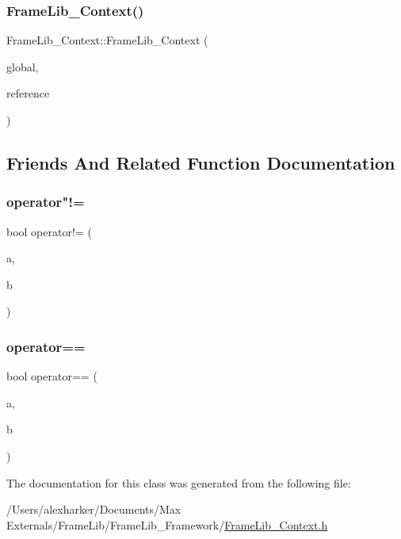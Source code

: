 \subsubsection{\texorpdfstring{Frame\+Lib\+\_\+\+Context()}{FrameLib\_Context()}}
{\footnotesize\ttfamily Frame\+Lib\+\_\+\+Context\+::\+Frame\+Lib\+\_\+\+Context (\begin{DoxyParamCaption}\item[{\hyperlink{class_frame_lib___global}{Frame\+Lib\+\_\+\+Global} $\ast$}]{global,  }\item[{void $\ast$}]{reference }\end{DoxyParamCaption})\hspace{0.3cm}{\ttfamily [inline]}}



\subsection{Friends And Related Function Documentation}
\mbox{\label{class_frame_lib___context_a7aed82ce3d334858032a3c45e3c70169}} 
\subsubsection{\texorpdfstring{operator"!=}{operator!=}}
{\footnotesize\ttfamily bool operator!= (\begin{DoxyParamCaption}\item[{const \hyperlink{class_frame_lib___context}{Frame\+Lib\+\_\+\+Context} \&}]{a,  }\item[{const \hyperlink{class_frame_lib___context}{Frame\+Lib\+\_\+\+Context} \&}]{b }\end{DoxyParamCaption})\hspace{0.3cm}{\ttfamily [friend]}}

\mbox{\label{class_frame_lib___context_ab0382454ba28ee3ff302be24ffc861c0}} 
\subsubsection{\texorpdfstring{operator==}{operator==}}
{\footnotesize\ttfamily bool operator== (\begin{DoxyParamCaption}\item[{const \hyperlink{class_frame_lib___context}{Frame\+Lib\+\_\+\+Context} \&}]{a,  }\item[{const \hyperlink{class_frame_lib___context}{Frame\+Lib\+\_\+\+Context} \&}]{b }\end{DoxyParamCaption})\hspace{0.3cm}{\ttfamily [friend]}}



The documentation for this class was generated from the following file\+:\begin{DoxyCompactItemize}
\item 
/\+Users/alexharker/\+Documents/\+Max Externals/\+Frame\+Lib/\+Frame\+Lib\+\_\+\+Framework/\hyperlink{_frame_lib___context_8h}{Frame\+Lib\+\_\+\+Context.\+h}\end{DoxyCompactItemize}
